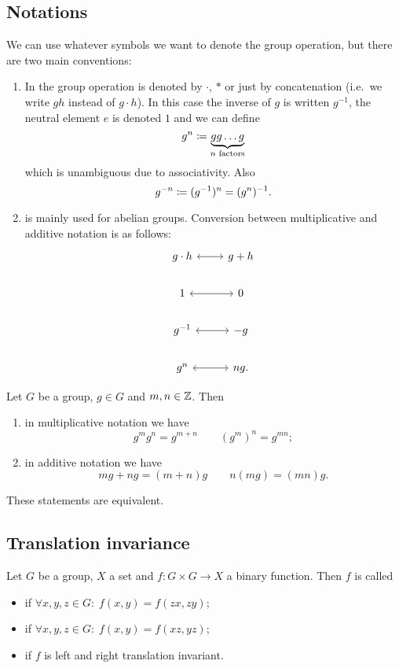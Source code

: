 \subsection{Notations}
We can use whatever symbols we want to denote the group operation, but there are two main conventions:
\begin{enumerate}
\item In  the group operation is denoted by $\boldsymbol{\cdot}$, $*$ or just by concatenation (i.e.\ we write $gh$ instead of $g\cdot h$). In this case the inverse of $g$ is written $g^{-1}$, the neutral element $e$ is denoted $1$ and we can define
\[ g^n \coloneqq \underbrace{gg\ldots g}_{\text{$n$ factors}}\]
which is unambiguous due to associativity. Also
\[ g^{-n} \coloneqq (g^{-1})^n = (g^{n})^{-1}. \]
\item {} is mainly used for abelian groups. Conversion between multiplicative and additive notation is as follows:
\[ \begin{tikzcd}
g\cdot h \arrow[r, leftrightarrow]& g+h \\
1 \arrow[r, leftrightarrow]& 0 \\
g^{-1} \arrow[r, leftrightarrow]& -g \\
g^n \arrow[r, leftrightarrow] & ng.
\end{tikzcd} \]
\end{enumerate}

\begin{lemma} \label{calculusRepeatedGroupOperation}
Let $G$ be a group, $g\in G$ and $m,n\in \mathbb{Z}$. Then
\begin{enumerate}
\item in multiplicative notation we have
\[ g^mg^n = g^{m+n} \qquad (g^m)^n = g^{mn}; \]
\item in additive notation we have
\[ mg+ng = (m+n)g \qquad n(mg) = (mn)g. \]
\end{enumerate}
These statements are equivalent.
\end{lemma}

\subsection{Translation invariance}
\begin{definition}
Let $G$ be a group, $X$ a set and $f:G\times G \to X$ a binary function. Then $f$ is called
\begin{itemize}
\item {} if $\forall x,y,z\in G:\; f(x, y) = f(zx,zy)$;
\item {} if $\forall x,y,z\in G:\; f(x, y) = f(xz,yz)$;
\item {} if $f$ is left and right translation invariant.
\end{itemize}
\end{definition}

